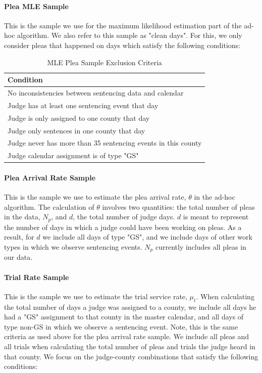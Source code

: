 \documentclass[11pt, oneside]{article}   	%
\theoremstyle{ModifiedStyle}
\begin{document}
			\paragraph{Plea MLE Sample} This is the sample we use for the maximum likelihood estimation part of the ad-hoc algorithm. We also refer to this sample as "clean days". For this, we only consider pleas that happened on days which satisfy the following conditions:
				\begin{table}[H]
					\centering
					\caption{MLE Plea Sample Exclusion Criteria}
					\begin{tabular}{|l|}
					\hline
					\textbf{Condition}                                                  \\ \hline
					No inconsistencies between sentencing data and calendar \\ \hline
					Judge has at least one sentencing event that day         \\ \hline
					Judge is only assigned to one county that day          \\ \hline
					Judge only sentences in one county that day             \\ \hline
					Judge never has more than 35 sentencing events in this county \\ \hline
					Judge calendar assignment is of type "GS"           \\ \hline
					\end{tabular}
				\end{table}

			\paragraph{Plea Arrival Rate Sample} This is the sample we use to estimate the plea arrival rate, $\theta$ in the ad-hoc algorithm. The calculation of $\theta$ involves two quantities: the total number of pleas in the data, $N_p$, and $d$, the total number of judge days. $d$ is meant to represent the number of days in which a judge could have been working on pleas. As a result, for $d$ we include all days of type "GS", and we include days of other work types in which we observe sentencing events. $N_p$ currently includes all pleas in our data.

			\paragraph{Trial Rate Sample} This is the sample we use to estimate the trial service rate, $\mu_t$. When calculating the total number of days a judge was assigned to a county, we include all days he had a "GS" assignment to that county in the master calendar, and all days of type non-GS in which we observe a sentencing event. Note, this is the same criteria as used above for the plea arrival rate sample. We include all pleas and all trials when calculating the total number of pleas and trials the judge heard in that county. We focus on the judge-county combinations that satisfy the following conditions:
\end{document}
